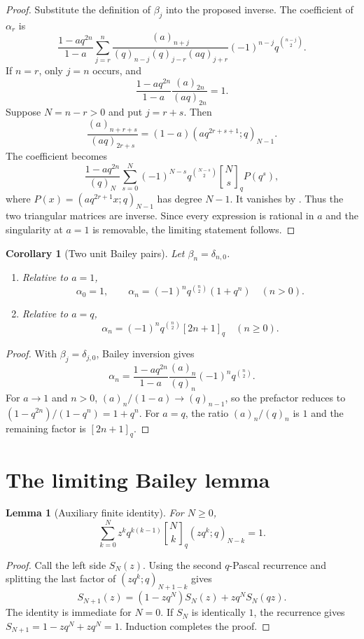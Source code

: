 \documentclass[11pt,oneside,openany]{book}
\newtheorem{lemma}[theorem]{Lemma}
\newtheorem{corollary}[theorem]{Corollary}
\theoremstyle{definition}
\theoremstyle{remark}
\newcommand{\qbinom}[2]{\genfrac{[}{]}{0pt}{}{#1}{#2}_{q}}
\begin{document}
\begin{proof}
Substitute the definition of $\beta_j$ into the proposed inverse.  The coefficient of $\alpha_r$ is
\[
 \frac{1-aq^{2n}}{1-a}
 \sum_{j=r}^{n}
 \frac{(a)_{n+j}}{(q)_{n-j}(q)_{j-r}(aq)_{j+r}}
 (-1)^{n-j}q^{\binom{n-j}{2}}.
\]
If $n=r$, only $j=n$ occurs, and
\[
 \frac{1-aq^{2n}}{1-a}\frac{(a)_{2n}}{(aq)_{2n}}=1.
\]
Suppose $N=n-r>0$ and put $j=r+s$.  Then
\[
 \frac{(a)_{n+r+s}}{(aq)_{2r+s}}
 =(1-a)(aq^{2r+s+1};q)_{N-1}.
\]
The coefficient becomes
\[
 \frac{1-aq^{2n}}{(q)_N}
 \sum_{s=0}^{N}(-1)^{N-s}q^{\binom{N-s}{2}}
 \qbinom Ns P(q^s),
\]
where
\(
 P(x)=(aq^{2r+1}x;q)_{N-1}
\)
has degree $N-1$.  It vanishes by .  Thus the two triangular matrices are inverse.  Since every expression is rational in $a$ and the singularity at $a=1$ is removable, the limiting statement follows.
\end{proof}

\begin{corollary}[Two unit Bailey pairs]\label{cor:unit-bailey-pairs}
Let $\beta_n=\delta_{n,0}$.
\begin{enumerate}[label=\textup{(\roman*)}]
\item Relative to $a=1$,
\[
 \alpha_0=1,
 \qquad
 \alpha_n=(-1)^nq^{\binom n2}(1+q^n)\quad(n>0).
\]
\item Relative to $a=q$,
\[
 \alpha_n=(-1)^nq^{\binom n2}[2n+1]_q\quad(n\ge0).
\]
\end{enumerate}
\end{corollary}

\begin{proof}
With $\beta_j=\delta_{j,0}$, Bailey inversion gives
\[
 \alpha_n=\frac{1-aq^{2n}}{1-a}
 \frac{(a)_n}{(q)_n}(-1)^nq^{\binom n2}.
\]
For $a\to1$ and $n>0$, $(a)_n/(1-a)\to(q)_{n-1}$, so the prefactor reduces to
\(
 (1-q^{2n})/(1-q^n)=1+q^n.
\)
For $a=q$, the ratio $(a)_n/(q)_n$ is $1$ and the remaining factor is $[2n+1]_q$.
\end{proof}

\section{The limiting Bailey lemma}

\begin{lemma}[Auxiliary finite identity]\label{lem:bailey-aux}
For $N\ge0$,
\[
 \sum_{k=0}^{N}z^kq^{k(k-1)}\qbinom Nk
 (zq^k;q)_{N-k}=1.
\]
\end{lemma}

\begin{proof}
Call the left side $S_N(z)$.  Using the second $q$-Pascal recurrence and splitting the last factor of $(zq^k;q)_{N+1-k}$ gives
\[
 S_{N+1}(z)=(1-zq^N)S_N(z)+zq^NS_N(qz).
\]
The identity is immediate for $N=0$.  If $S_N$ is identically $1$, the recurrence gives $S_{N+1}=1-zq^N+zq^N=1$.  Induction completes the proof.
\end{proof}
\end{document}
